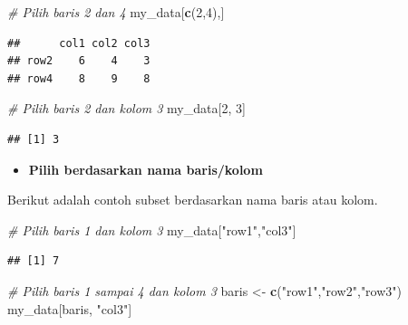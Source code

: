 \documentclass[]{book}
\newenvironment{Shaded}{\begin{snugshade}}{\end{snugshade}}
\newcommand{\CommentTok}[1]{\textcolor[rgb]{0.56,0.35,0.01}{\textit{#1}}}
\newcommand{\DecValTok}[1]{\textcolor[rgb]{0.00,0.00,0.81}{#1}}
\newcommand{\KeywordTok}[1]{\textcolor[rgb]{0.13,0.29,0.53}{\textbf{#1}}}
\newcommand{\NormalTok}[1]{#1}
\newcommand{\StringTok}[1]{\textcolor[rgb]{0.31,0.60,0.02}{#1}}
\providecommand{\tightlist}{%
  \setlength{\itemsep}{0pt}\setlength{\parskip}{0pt}}
\theoremstyle{definition}
\theoremstyle{definition}
\theoremstyle{definition}
\theoremstyle{remark}
\begin{document}
\begin{Shaded}
\begin{Highlighting}[]
\CommentTok{# Pilih baris 2 dan 4}
\NormalTok{my_data[}\KeywordTok{c}\NormalTok{(}\DecValTok{2}\NormalTok{,}\DecValTok{4}\NormalTok{),]}
\end{Highlighting}
\end{Shaded}

\begin{verbatim}
##      col1 col2 col3
## row2    6    4    3
## row4    8    9    8
\end{verbatim}

\begin{Shaded}
\begin{Highlighting}[]
\CommentTok{# Pilih baris 2 dan kolom 3}
\NormalTok{my_data[}\DecValTok{2}\NormalTok{, }\DecValTok{3}\NormalTok{]}
\end{Highlighting}
\end{Shaded}

\begin{verbatim}
## [1] 3
\end{verbatim}

\begin{itemize}
\tightlist
\item
  \textbf{Pilih berdasarkan nama baris/kolom}
\end{itemize}

Berikut adalah contoh subset berdasarkan nama baris atau kolom.

\begin{Shaded}
\begin{Highlighting}[]
\CommentTok{# Pilih baris 1 dan kolom 3}
\NormalTok{my_data[}\StringTok{"row1"}\NormalTok{,}\StringTok{"col3"}\NormalTok{]}
\end{Highlighting}
\end{Shaded}

\begin{verbatim}
## [1] 7
\end{verbatim}

\begin{Shaded}
\begin{Highlighting}[]
\CommentTok{# Pilih baris 1 sampai 4 dan kolom 3}
\NormalTok{baris <-}\StringTok{ }\KeywordTok{c}\NormalTok{(}\StringTok{"row1"}\NormalTok{,}\StringTok{"row2"}\NormalTok{,}\StringTok{"row3"}\NormalTok{)}
\NormalTok{my_data[baris, }\StringTok{"col3"}\NormalTok{]}
\end{Highlighting}
\end{Shaded}
\end{document}
